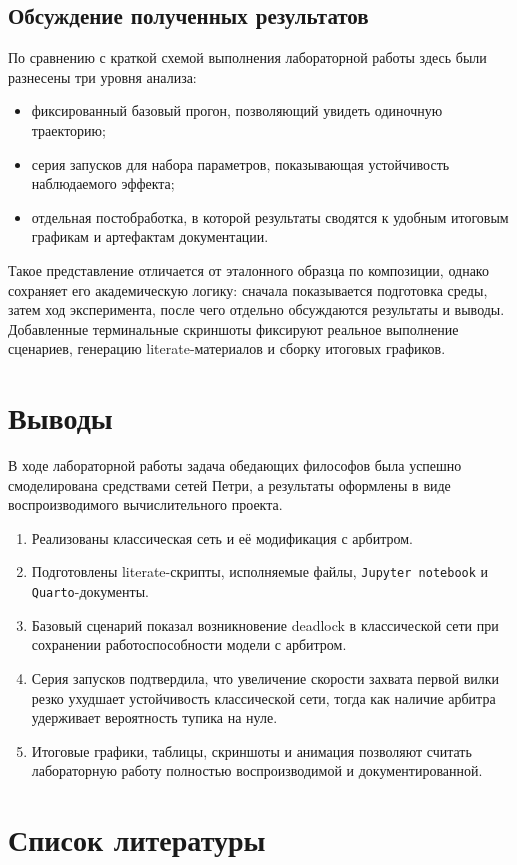 \documentclass[
  12pt,
  a4paper,
  DIV=11,
  numbers=noendperiod]{scrreprt}
\providecommand{\tightlist}{%
  \setlength{\itemsep}{0pt}\setlength{\parskip}{0pt}}\usepackage{longtable,booktabs,array}
\begin{document}
\section{Обсуждение полученных
результатов}\label{ux43eux431ux441ux443ux436ux434ux435ux43dux438ux435-ux43fux43eux43bux443ux447ux435ux43dux43dux44bux445-ux440ux435ux437ux443ux43bux44cux442ux430ux442ux43eux432}

По сравнению с краткой схемой выполнения лабораторной работы здесь были
разнесены три уровня анализа:

\begin{itemize}
\tightlist
\item
  фиксированный базовый прогон, позволяющий увидеть одиночную
  траекторию;
\item
  серия запусков для набора параметров, показывающая устойчивость
  наблюдаемого эффекта;
\item
  отдельная постобработка, в которой результаты сводятся к удобным
  итоговым графикам и артефактам документации.
\end{itemize}

Такое представление отличается от эталонного образца по композиции,
однако сохраняет его академическую логику: сначала показывается
подготовка среды, затем ход эксперимента, после чего отдельно
обсуждаются результаты и выводы. Добавленные терминальные скриншоты
фиксируют реальное выполнение сценариев, генерацию literate-материалов и
сборку итоговых графиков.

\chapter{Выводы}\label{ux432ux44bux432ux43eux434ux44b}

В ходе лабораторной работы задача обедающих философов была успешно
смоделирована средствами сетей Петри, а результаты оформлены в виде
воспроизводимого вычислительного проекта.

\begin{enumerate}
\def\labelenumi{\arabic{enumi}.}
\tightlist
\item
  Реализованы классическая сеть и её модификация с арбитром.
\item
  Подготовлены literate-скрипты, исполняемые файлы,
  \texttt{Jupyter\ notebook} и \texttt{Quarto}-документы.
\item
  Базовый сценарий показал возникновение deadlock в классической сети
  при сохранении работоспособности модели с арбитром.
\item
  Серия запусков подтвердила, что увеличение скорости захвата первой
  вилки резко ухудшает устойчивость классической сети, тогда как наличие
  арбитра удерживает вероятность тупика на нуле.
\item
  Итоговые графики, таблицы, скриншоты и анимация позволяют считать
  лабораторную работу полностью воспроизводимой и документированной.
\end{enumerate}

\chapter*{Список
литературы}\label{ux441ux43fux438ux441ux43eux43a-ux43bux438ux442ux435ux440ux430ux442ux443ux440ux44b}

\printbibliography[heading=none]
\end{document}
